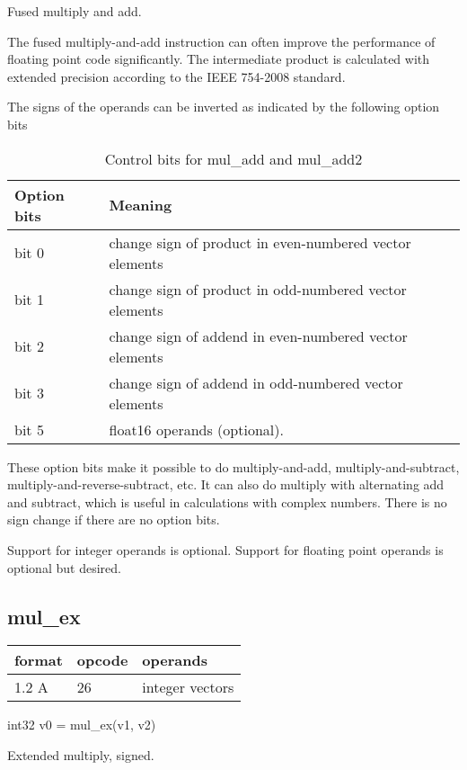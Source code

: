 \documentclass[forwardcom.tex]{subfiles}
\begin{document}
Fused multiply and add.
\vv

The fused multiply-and-add instruction can often improve the performance of floating point code significantly. The intermediate product is calculated with extended precision according to the IEEE 754-2008 standard.
\vv

The signs of the operands can be inverted as indicated by the following option bits

\begin{longtable} {|p{20mm}|p{75mm}|}
\caption{Control bits for mul\_add and mul\_add2} 
\label{table:ControlBitsForMulAdd} \\
\endfirsthead
\endhead
\hline
\bfseries Option bits &  \bfseries Meaning   \\
\hline
bit 0 & change sign of product in even-numbered vector elements \\
bit 1 & change sign of product in odd-numbered vector elements \\
bit 2 & change sign of addend in even-numbered vector elements \\
bit 3 & change sign of addend in odd-numbered vector elements \\
\hline
bit 5 & float16 operands (optional). \\
\hline
\end{longtable}

\vv
These option bits make it possible to do multiply-and-add, multiply-and-subtract, multiply-and-reverse-subtract, etc. It can also do multiply with alternating add and subtract, which is useful in calculations with complex numbers. 
There is no sign change if there are no option bits. 

\vv
Support for integer operands is optional. Support for floating point operands is optional but desired.
\vv


\subsection{mul\_ex}
\label{table:mulExInstruction}
\begin{tabular}{|p{12mm}|p{15mm}|p{100mm}|}
\hline
\bfseries format & \bfseries opcode & \bfseries operands \\ \hline
1.2 A & 26 & integer vectors \\ \hline
\end{tabular}
\vv

int32 v0 = mul\_ex(v1, v2)
\vv

Extended multiply, signed.
\vv
\end{document}

